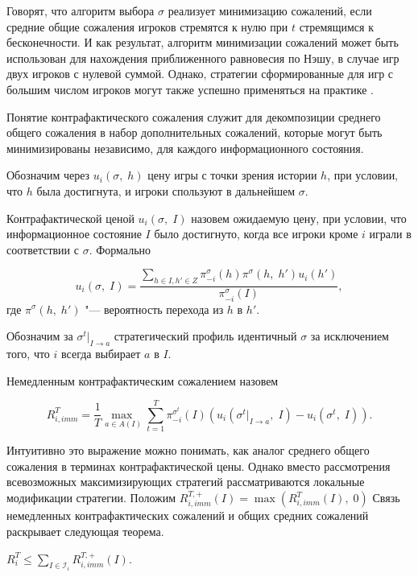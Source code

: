Говорят, что алгоритм выбора $\sigma$ реализует минимизацию сожалений, если средние общие сожаления игроков стремятся к нулю при $t$ стремящимся к бесконечности. И как результат, алгоритм минимизации сожалений может быть использован для нахождения приближенного равновесия по Нэшу, в случае игр двух игроков с нулевой суммой. Однако, стратегии сформированные для игр с большим числом игроков могут также успешно применяться на практике \cite{aay2400}.

Понятие контрафактического сожаления служит для декомпозиции среднего общего сожаления в набор дополнительных сожалений, которые могут быть минимизированы независимо, для каждого информационного состояния.  

Обозначим через $u_i(\sigma,\;h)$ цену игры с точки зрения истории $h$, при условии, что $h$ была достигнута, и игроки спользуют в дальнейшем $\sigma$. 

\begin{defin}
	Контрафактической ценой $u_i(\sigma,\;I)$ назовем ожидаемую цену, при условии, что информационное состояние $I$ было достигнуто, когда все игроки кроме $i$ играли в соответствии с $\sigma$. Формально 
\end{defin} 
\begin{equation}
	u_i(\sigma,\;I)=\frac{\sum_{h\in I,h'\in Z}\pi_{-i}^\sigma(h)\pi^\sigma(h,\;h')u_i(h')}{\pi_{-i}^\sigma(I)},
\end{equation}
где $\pi^\sigma(h,\;h')$ "--- вероятность перехода из $h$ в $h'$.

Обозначим за $\sigma^t |_{I \to a}$ стратегический профиль идентичный $\sigma$ за исключением того, что $i$ всегда выбирает $a$ в $I$. 

Немедленным контрафактическим сожалением назовем 

\begin{equation}\label{Sych_eq1}
	R_{i,imm}^T = \frac{1}{T}\underset{a\in A(I)}{\max\;}\sum_{t=1}^{T}\pi_{-i}^{\sigma^t}(I)(u_i(\sigma^t |_{I \to a},\;I)-u_i(\sigma^t,\;I)).
\end{equation}

Интуитивно это выражение можно понимать, как аналог среднего общего сожаления в терминах контрафактической цены. Однако вместо рассмотрения всевозможных максимизирующих стратегий рассматриваются локальные модификации стратегии. Положим $R_{i,imm}^{T,+}(I) = \max (R_{i,imm}^{T}(I),\;0)$ Связь немедленных контрафактических сожалений и общих средних сожалений раскрывает следующая теорема. 

\begin{theo} 
	$R_i^T \leq \sum_{I\in \mathcal{I}_i}R_{i,imm}^{T,+}(I)$.
\end{theo}

